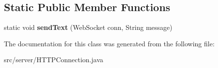 \subsection*{Static Public Member Functions}
\begin{DoxyCompactItemize}
\item 
\hypertarget{classserver_1_1_h_t_t_p_connection_aa2be7a6b81a253ccf360ec91e11d2f38}{
static void {\bfseries sendText} (WebSocket conn, String message)}
\label{classserver_1_1_h_t_t_p_connection_aa2be7a6b81a253ccf360ec91e11d2f38}

\end{DoxyCompactItemize}


The documentation for this class was generated from the following file:\begin{DoxyCompactItemize}
\item 
src/server/HTTPConnection.java\end{DoxyCompactItemize}
